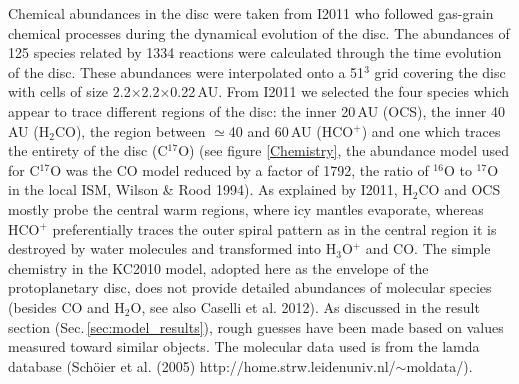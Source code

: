 \documentclass[useAMS,usenatbib]{mn2e}
\begin{document}
Chemical abundances in the disc were taken from I2011 who followed gas-grain chemical processes during the dynamical evolution of the disc. The abundances of 125 species related by 1334 reactions were calculated through the time evolution of the disc. These abundances were interpolated onto a 51$^3$ grid covering the disc with cells of size 2.2$\times$2.2$\times$0.22$\,$AU.  From I2011 we selected the four species which appear to trace different regions of the disc: the inner 20\,AU (OCS), the inner 40\,AU (H$_2$CO),  the region between $\simeq$40 and 60\,AU (HCO$^+$) and one which traces the entirety of the disc (C$^{17}$O) (see figure \ref{Chemistry}, the abundance model used for C$^{17}$O was the CO model reduced by a factor of 1792, the ratio of $^{16}$O to $^{17}$O in the local ISM, Wilson \& Rood 1994). As explained by I2011,  H$_2$CO and OCS mostly probe the central warm regions, where icy mantles evaporate, whereas HCO$^+$ preferentially traces the outer spiral pattern as in the central region it is destroyed by water molecules and transformed into H$_3$O$^+$ and CO. The simple chemistry in the KC2010 model, adopted here as the envelope of the protoplanetary disc, does not provide detailed abundances of molecular species (besides CO and H$_2$O, see also Caselli et al. 2012). As discussed in the result section (Sec.\,\ref{sec:model_results}), rough guesses have been made based on values measured toward similar objects. The molecular data used is from the lamda database (Sch\"oier et al. (2005) http://home.strw.leidenuniv.nl/$\sim$moldata/).
\end{document}
